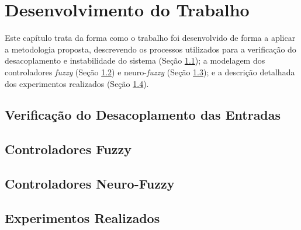 \chapter{Desenvolvimento do Trabalho}
\label{chap:desenvolvimento-trabalho}

Este capítulo trata da forma como o trabalho foi desenvolvido de forma a aplicar a metodologia proposta, descrevendo os processos utilizados para a verificação do desacoplamento e instabilidade do sistema (Seção \ref{sec:verificacao-desacoplamento}); a modelagem dos controladores \textit{fuzzy} (Seção \ref{sec:controlador-fuzzy}) e neuro-\textit{fuzzy} (Seção \ref{sec:controlador-neuro-fuzzy}); e a descrição detalhada dos experimentos realizados (Seção \ref{sec:experimentos-realizados}).

\section{Verificação do Desacoplamento das Entradas}
\label{sec:verificacao-desacoplamento}



\section{Controladores Fuzzy}
\label{sec:controlador-fuzzy}



\section{Controladores Neuro-Fuzzy}
\label{sec:controlador-neuro-fuzzy}



\section{Experimentos Realizados}
\label{sec:experimentos-realizados}

